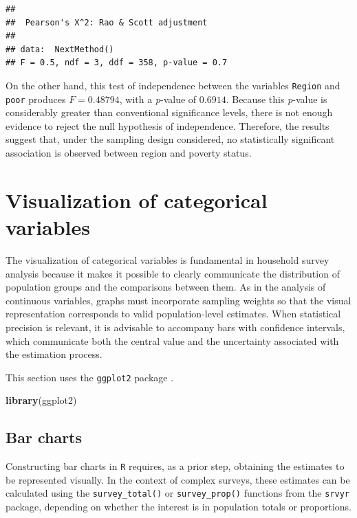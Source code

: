 \documentclass[
  english,
  12pt,
]{book}
\newenvironment{Shaded}{\begin{snugshade}}{\end{snugshade}}
\newcommand{\FunctionTok}[1]{\textcolor[rgb]{0.13,0.29,0.53}{\textbf{#1}}}
\newcommand{\NormalTok}[1]{#1}
\begin{document}
\begin{verbatim}
## 
##  Pearson's X^2: Rao & Scott adjustment
## 
## data:  NextMethod()
## F = 0.5, ndf = 3, ddf = 358, p-value = 0.7
\end{verbatim}

On the other hand, this test of independence between the variables \texttt{Region} and \texttt{poor} produces \(F = 0.48794\), with a \emph{p}-value of \(0.6914\). Because this \emph{p}-value is considerably greater than conventional significance levels, there is not enough evidence to reject the null hypothesis of independence. Therefore, the results suggest that, under the sampling design considered, no statistically significant association is observed between region and poverty status.

\section{Visualization of categorical variables}\label{viz-categoricas}

The visualization of categorical variables is fundamental in household survey analysis because it makes it possible to clearly communicate the distribution of population groups and the comparisons between them. As in the analysis of continuous variables, graphs must incorporate sampling weights so that the visual representation corresponds to valid population-level estimates. When statistical precision is relevant, it is advisable to accompany bars with confidence intervals, which communicate both the central value and the uncertainty associated with the estimation process.

This section uses the \texttt{ggplot2} package \citep{ggplot22026}.

\begin{Shaded}
\begin{Highlighting}[]
\FunctionTok{library}\NormalTok{(ggplot2)}
\end{Highlighting}
\end{Shaded}

\subsection{Bar charts}\label{graficos-de-barras}

Constructing bar charts in \texttt{R} requires, as a prior step, obtaining the estimates to be represented visually. In the context of complex surveys, these estimates can be calculated using the \texttt{survey\_total()} or \texttt{survey\_prop()} functions from the \texttt{srvyr} package, depending on whether the interest is in population totals or proportions.
\end{document}
